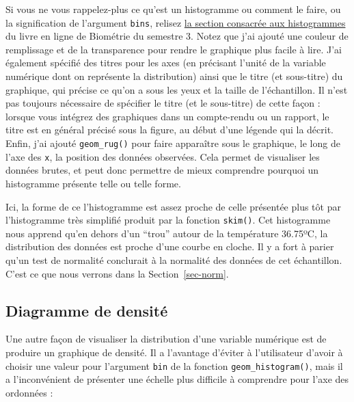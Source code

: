 \documentclass[
  a4paper,
  DIV=11,
  numbers=noendperiod,
  oneside]{scrreprt}
\begin{document}
Si vous ne vous rappelez-plus ce qu'est un histogramme ou comment le
faire, ou la signification de l'argument \texttt{bins}, relisez
\href{https://besibo.github.io/DA/viz.html\#histogram}{la section
consacrée aux histogrammes} du livre en ligne de Biométrie du semestre
3. Notez que j'ai ajouté une couleur de remplissage et de la
transparence pour rendre le graphique plus facile à lire. J'ai également
spécifié des titres pour les axes (en précisant l'unité de la variable
numérique dont on représente la distribution) ainsi que le titre (et
sous-titre) du graphique, qui précise ce qu'on a sous les yeux et la
taille de l'échantillon. Il n'est pas toujours nécessaire de spécifier
le titre (et le sous-titre) de cette façon : lorsque vous intégrez des
graphiques dans un compte-rendu ou un rapport, le titre est en général
précisé sous la figure, au début d'une légende qui la décrit. Enfin,
j'ai ajouté \texttt{geom\_rug()} pour faire apparaître sous le
graphique, le long de l'axe des \texttt{x}, la position des données
observées. Cela permet de visualiser les données brutes, et peut donc
permettre de mieux comprendre pourquoi un histogramme présente telle ou
telle forme.

Ici, la forme de ce l'histogramme est assez proche de celle présentée
plus tôt par l'histogramme très simplifié produit par la fonction
\texttt{skim()}. Cet histogramme nous apprend qu'en dehors d'un ``trou''
autour de la température 36.75ºC, la distribution des données est proche
d'une courbe en cloche. Il y a fort à parier qu'un test de normalité
conclurait à la normalité des données de cet échantillon. C'est ce que
nous verrons dans la Section~\ref{sec-norm}.

\hypertarget{diagramme-de-densituxe9}{%
\subsection{Diagramme de densité}\label{diagramme-de-densituxe9}}

Une autre façon de visualiser la distribution d'une variable numérique
est de produire un graphique de densité. Il a l'avantage d'éviter à
l'utilisateur d'avoir à choisir une valeur pour l'argument \texttt{bin}
de la fonction \texttt{geom\_histogram()}, mais il a l'inconvénient de
présenter une échelle plus difficile à comprendre pour l'axe des
ordonnées :
\end{document}
